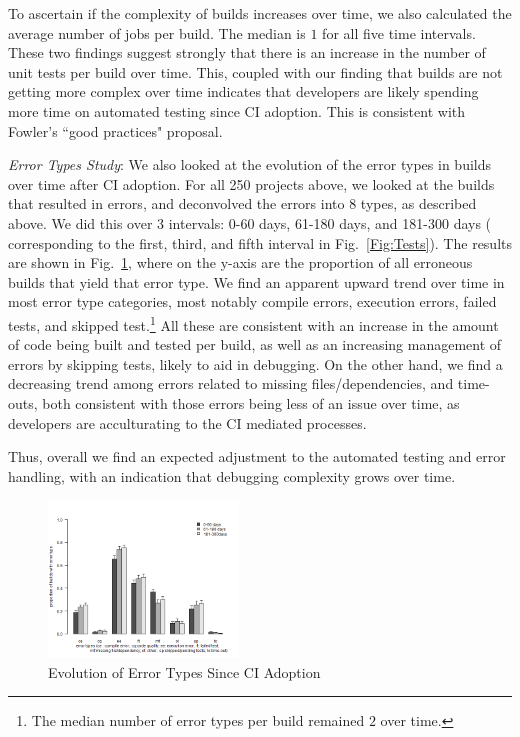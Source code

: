 To ascertain if the complexity of builds increases over time, we also calculated 
the average number of jobs per build.
The median is $1$ for all five time intervals.
These two findings suggest strongly that there is an increase in the number of 
unit tests per build over time.
This, coupled with our finding that builds are not getting more complex over time indicates that developers are likely spending more time on 
automated testing since CI adoption.
This is consistent with Fowler's ``good practices" proposal.



\smallskip\noindent \emph{Error Types Study}:
We also looked at the evolution of the error types in builds over time after CI 
adoption.
For all 250 projects above, we looked at the builds that resulted in errors, 
and deconvolved the errors into 8 types, as described above.
We did this over 3 intervals: 0-60 days, 61-180 days, and 181-300 days (\ie 
corresponding to the first, third, and fifth interval in Fig.~\ref{Fig:Tests}).
The results are shown in Fig.~\ref{Fig:BugTypes}, where on the y-axis are 
the proportion of all erroneous builds that yield that error type.
We find an apparent upward trend over time in most error type categories, 
most notably compile errors, execution errors, failed tests, and skipped 
test.\footnote{The median number of error types per build remained $2$ over 
time.}
All these are consistent with an increase in the amount of code being built 
and tested per build, as well as an increasing management of errors by 
skipping tests, likely to aid in debugging.
On the other hand, we find a decreasing trend among errors related to missing 
files/dependencies, and time-outs, both consistent with those errors being less 
of an issue over time, as developers are acculturating to the CI mediated 
processes.

Thus, overall we find an expected adjustment to the automated testing and 
error handling, with an indication that debugging complexity grows over time.



\begin{figure}[!t]
	\centering
	\includegraphics[width=0.45\textwidth, clip=true, trim=0 15 15 50]{new_plot_together.png}
	\caption{Evolution of Error Types Since CI Adoption}
	\label{Fig:BugTypes}
\end{figure}


